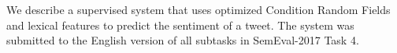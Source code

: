 We describe a supervised system that uses optimized Condition Random Fields and lexical features to predict the sentiment of a tweet. The system was submitted to the English version of all subtasks in SemEval-2017 Task 4.
